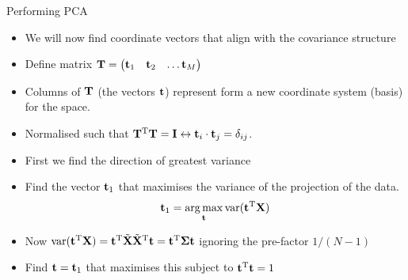 \documentclass[aspectratio=169]{beamer}
\begin{document}
\begin{frame}{Performing PCA}
  \begin{itemize}
    \item We will now find coordinate vectors that align with the covariance structure
    \item Define matrix $\mathbf{T}=\begin{pmatrix}\mathbf{t}_1 & \mathbf{t}_2 & \dots \mathbf{t}_M\end{pmatrix}$
    \item Columns of $\mathbf{T}$ (the vectors $\mathbf{t}$) represent  form a new coordinate system (basis) for the space.
    \item Normalised such that $\mathbf{T}^{\mathrm{T}}\mathbf{T}=\mathbf{I}\leftrightarrow \mathbf{t}_i\cdot\mathbf{t}_j = \delta_{ij}$.
    \item First we find the direction of greatest variance
    \item Find the vector $\mathbf{t}_1$ that maximises the variance of the projection of the data.
    \begin{equation*}
      \mathbf{t}_1 =  \operatorname*{arg\,max}_{\mathbf{t}}\operatorname*{var}(\mathbf{t}^{\mathrm{T}}\mathbf{X})
    \end{equation*}
    \item Now $\operatorname*{var}(\mathbf{t}^{\mathrm{T}}\mathbf{X})=\mathbf{t}^{\mathrm{T}}\tilde{\mathbf{X}}\tilde{\mathbf{X}}^{\mathrm{T}}\mathbf{t} = \mathbf{t}^{\mathrm{T}}\mathbf{\Sigma}\mathbf{t}$ ignoring the pre-factor $1/(N-1)$
    \item Find $\mathbf{t}=\mathbf{t}_1$ that maximises this subject to $\mathbf{t}^{\mathrm{T}}\mathbf{t}=1$
  \end{itemize}
\end{frame}
\end{document}

